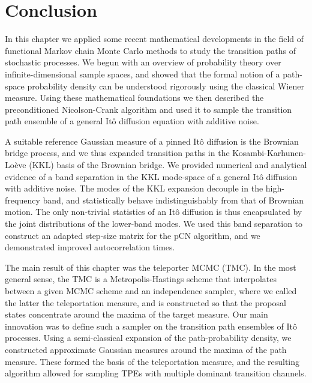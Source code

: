 
\section{Conclusion}

In this chapter we applied some recent mathematical developments in the field of functional Markov chain Monte Carlo methods to study the transition paths of stochastic processes. We begun with an overview of probability theory over infinite-dimensional sample spaces, and showed that the formal notion of a path-space probability density can be understood rigorously using the classical Wiener measure. Using these mathematical foundations we then described the preconditioned Nicolson-Crank algorithm and used it to sample the transition path ensemble of a general It\^{o} diffusion equation with additive noise.

A suitable reference Gaussian measure of a pinned It\^{o} diffusion is the Brownian bridge process, and we thus expanded transition paths in the Kosambi-Karhunen-Lo\`eve (KKL) basis of the Brownian bridge. We provided numerical and analytical evidence of a band separation in the KKL mode-space of a general It\^{o} diffusion with additive noise. The modes of the KKL expansion decouple in the high-frequency band, and statistically behave indistinguishably from that of Brownian motion. The only non-trivial statistics of an It\^{o} diffusion is thus encapsulated by the joint distributions of the lower-band modes. We used this band separation to construct an adapted step-size matrix for the pCN algorithm, and we demonstrated improved autocorrelation times.

The main result of this chapter was the teleporter MCMC (TMC). In the most general sense, the TMC is a Metropolis-Hastings scheme that interpolates between a given MCMC scheme and an independence sampler, where we called the latter the teleportation measure, and is constructed so that the proposal states concentrate around the maxima of the target measure. Our main innovation was to define such a sampler on the transition path ensembles of It\^{o} processes. Using a semi-classical expansion of the path-probability density, we constructed approximate Gaussian measures around the maxima of the path measure. These formed the basis of the teleportation measure, and the resulting algorithm allowed for sampling TPEs with multiple dominant transition channels.


